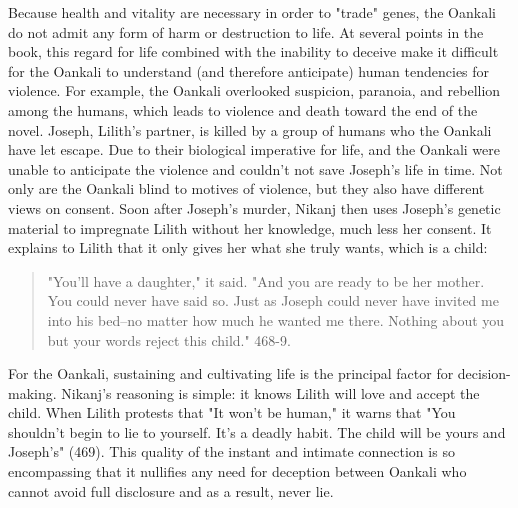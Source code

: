 \documentclass[11pt]{article}
\begin{document}
Because health and vitality are necessary in order to "trade" genes,
the Oankali do not admit any form of harm or destruction to life. At
several points in the book, this regard for life combined with the
inability to deceive make it difficult for the Oankali to understand
(and therefore anticipate) human tendencies for violence. For example,
the Oankali overlooked suspicion, paranoia, and rebellion among the
humans, which leads to violence and death toward the end of the
novel. Joseph, Lilith's partner, is killed by a group of humans who
the Oankali have let escape. Due to their biological imperative for
life, and the Oankali were unable to anticipate the violence and
couldn't not save Joseph's life in time. Not only are the Oankali
blind to motives of violence, but they also have different views on
consent. Soon after Joseph's murder, Nikanj then uses Joseph's genetic
material to impregnate Lilith without her knowledge, much less her
consent. It explains to Lilith that it only gives her what she truly
wants, which is a child:
\begin{quote}
"You'll have a daughter," it said. "And you are ready to be her
mother. You could never have said so. Just as Joseph could never have
invited me into his bed--no matter how much he wanted me
there. Nothing about you but your words reject this child." 468-9.
\end{quote}
For the Oankali, sustaining and cultivating life is the principal
factor for decision-making. Nikanj's reasoning is simple: it knows
Lilith will love and accept the child. When Lilith protests that "It
won't be human," it warns that "You shouldn't begin to lie to
yourself. It's a deadly habit. The child will be yours and Joseph's"
(469). This quality of the instant and intimate connection is so
encompassing that it nullifies any need for deception between Oankali
who cannot avoid full disclosure and as a result, never lie.
\end{document}
